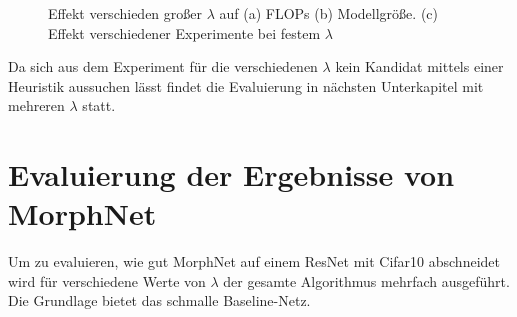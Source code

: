 \begin{figure}
     \centering
     \hfill
     \caption{Effekt verschieden großer $\lambda$ auf  (a) FLOPs (b) Modellgröße. (c) Effekt verschiedener Experimente bei festem $\lambda$ }
     \label{abb:morph2}
\end{figure}
Da sich aus dem Experiment für die verschiedenen $\lambda$ kein Kandidat mittels einer Heuristik aussuchen lässt findet die Evaluierung in nächsten Unterkapitel mit mehreren $\lambda$ statt.


\section{Evaluierung der Ergebnisse von MorphNet}

Um zu evaluieren, wie gut MorphNet auf einem ResNet mit Cifar10 abschneidet wird für verschiedene Werte von $\lambda$ der gesamte Algorithmus mehrfach ausgeführt. Die Grundlage bietet das schmalle Baseline-Netz.


